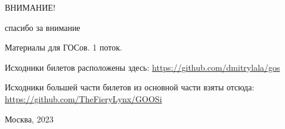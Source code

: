 \begingroup
    \centerline{ВНИМАНИЕ!}
    \centerline{спасибо за внимание}
    \centerline{\hfill\hrulefill\hrulefill\hfill}
    \vskip1.5cm
    \centerline{Материалы для ГОСов. 1 поток.}
    \vskip1.5cm

    Исходники билетов расположены здесь:
    \url{https://github.com/dmitrylala/gos}
    
    Исходники большей части билетов из основной части взяты отсюда: \url{https://github.com/TheFieryLynx/GOOSi}

    \bigbreak
    \bigbreak
    \bigbreak
    \bigbreak
    \bigbreak

    \vfill
    \centerline{Москва, 2023}
\endgroup
